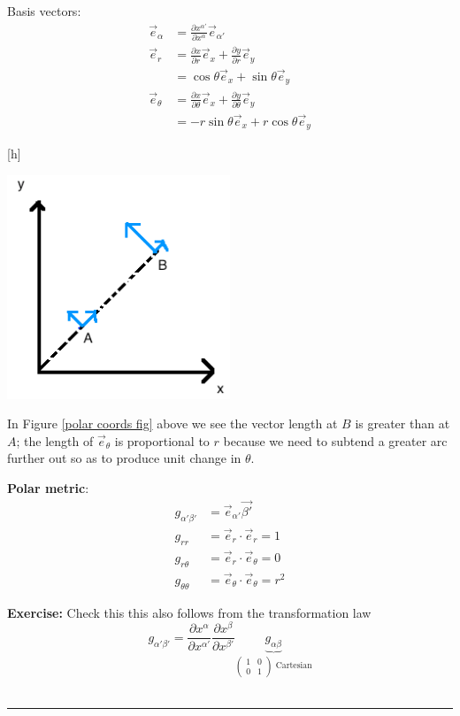 \documentclass[a4paper]{article} %
\newcommand{\exercise}[2]
{
\begin{framed}
\textbf{Exercise:} #1 \\\hrule
#2
\end{framed}
}
\newcommand{\pmx}[1]{
\begin{pmatrix}
#1
\end{pmatrix}
}
\begin{document}
Basis vectors:
\begin{align}
\vec{e}_{\alpha}&=\frac{\partial x^{\alpha'}}{\partial x^{\alpha}}\vec{e}_{\alpha'}\\
\vec{e}_r&=\frac{\partial x}{\partial r}\vec{e}_x+\frac{\partial y}{\partial r}\vec{e}_y\\
&=\cos\theta\vec{e}_x+\sin\theta\vec{e}_y\\
\vec{e}_{\theta}&=\frac{\partial x}{\partial \theta}\vec{e}_x+\frac{\partial y}{\partial \theta}\vec{e}_y\\
&=-r\sin\theta\vec{e}_x+r\cos\theta \vec{e}_y
\end{align}

\begin{center}[h]

\includegraphics[width=0.5\textwidth]{images/polar.png}
\label{polar coords fig}
\end{center}
 
In Figure \ref{polar coords fig} above we see the vector length at $B$ is greater than at $A$; the length of $\vec{e}_\theta$ is proportional to $r$ because we need to subtend a greater arc further out so as to produce unit change in $\theta$.


\textbf{Polar metric}:
\begin{align}
g_{\alpha'\beta'}&=\vec{e}_{\alpha'}\vec{\beta'}\\
g_{rr}&=\vec{e}_r\cdot\vec{e}_r=1\\
g_{r\theta}&=\vec{e}_r\cdot \vec{e}_{\theta}=0\\
g_{\theta\theta}&=\vec{e}_{\theta}\cdot\vec{e}_{\theta}=r^2
\end{align}

\exercise{
Check this this also follows from the transformation law
\begin{equation}
g_{\alpha'\beta'}=\frac{\partial x^{\alpha}}{\partial x^{\alpha'}}\frac{\partial x^{\beta}}{\partial x^{\beta'}}
\underbrace{g_{\alpha\beta}}_{\pmx{1&0\\0&1}\text{ Cartesian}}
\end{equation}
}
{}
\end{document}

